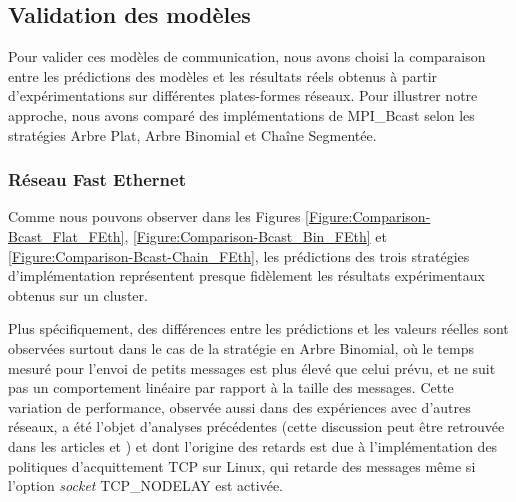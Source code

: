 %
%
%
%	
%
%


\subsection{\label{sub:Broadcast_Practical}Validation des modèles}

Pour valider ces modèles de communication, nous avons choisi la comparaison
entre les prédictions des modèles et les résultats réels obtenus à
partir d'expérimentations sur différentes plates-formes réseaux. Pour
illustrer notre approche, nous avons comparé des implémentations de
MPI\_Bcast selon les stratégies Arbre Plat, Arbre Binomial et Chaîne
Segmentée. 


\subsubsection*{Réseau Fast Ethernet}

Comme nous pouvons observer dans les Figures \ref{Figure:Comparison-Bcast_Flat_FEth},
\ref{Figure:Comparison-Bcast_Bin_FEth} et \ref{Figure:Comparison-Bcast-Chain_FEth},
les prédictions des trois stratégies d'implémentation représentent presque
fidèlement les résultats expérimentaux obtenus sur un cluster.

Plus spécifiquement, des différences entre les prédictions et les
valeurs réelles sont observées surtout dans le cas de la stratégie
en Arbre Binomial, où le temps mesuré pour l'envoi de petits messages
est plus élevé que celui prévu, et ne suit pas un comportement linéaire
par rapport à la taille des messages. Cette variation de performance,
observée aussi dans des expériences avec d'autres réseaux,
a été l'objet d'analyses précédentes (cette discussion peut être retrouvée
dans les articles \cite{Steffenel04a} et \cite{Steffenel04c}) et dont l'origine des retards
est due à l'implémentation des politiques d'acquittement TCP sur Linux, qui retarde
des messages même si l'option \emph{socket} TCP\_NODELAY est activée. 

